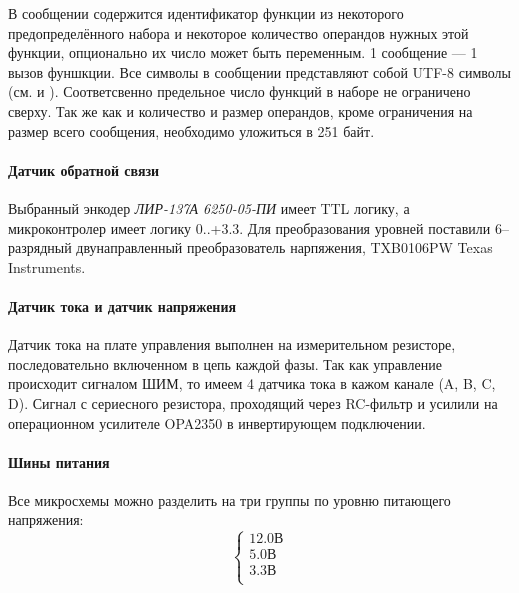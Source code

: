 В сообщении содержится идентификатор функции из некоторого предопределённого
набора и некоторое количество операндов нужных этой функции, опционально их
число может быть переменным.
1 сообщение --- 1 вызов фуншкции.
Все символы в сообщении представляют собой UTF-8 символы
(см. \cite{ISO_IEC_10646_2012} и \cite{rfc3629}). Соответсвенно предельное число
функций в наборе не ограничено сверху. Так же как и количество и размер
операндов, кроме ограничения на размер всего сообщения, необходимо уложиться в
251 байт.

\paragraph{Датчик обратной связи}
Выбранный энкодер \textit{ЛИР-137А 6250-05-ПИ} имеет TTL логику, а
микроконтролер имеет логику 0..+3.3. Для преобразования уровней поставили
6--разрядный двунаправленный преобразователь нарпяжения,
TXB0106PW Texas Instruments.

\paragraph{Датчик тока и датчик напряжения}
Датчик тока на плате управления выполнен на измерительном резисторе,
последовательно включенном в цепь каждой фазы. Так как управление происходит
сигналом ШИМ, то имеем 4 датчика тока в кажом канале (A, B, C, D).
Сигнал с сериесного резистора, проходящий через RC-фильтр и усилили на
операционном усилителе OPA2350 в инвертирующем подключении.

\paragraph{Шины питания}
Все микросхемы можно разделить на три группы по уровню питающего напряжения:
$$
    \left\{
    \begin{aligned}
        12.0 \text{В} \\
        5.0  \text{В} \\
        3.3  \text{В} \\
    \end{aligned}
    \right.
$$

